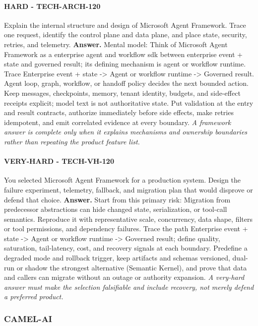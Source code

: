 \paragraph{HARD - TECH-ARCH-120} Explain the internal structure and design of Microsoft Agent Framework. Trace one request, identify the control plane and data plane, and place state, security, retries, and telemetry.
\textbf{Answer.} Mental model: Think of Microsoft Agent Framework as a enterprise agent and workflow sdk between enterprise event + state and governed result; its defining mechanism is agent or workflow runtime. Trace Enterprise event + state -> Agent or workflow runtime -> Governed result. Agent loop, graph, workflow, or handoff policy decides the next bounded action. Keep messages, checkpoints, memory, tenant identity, budgets, and side-effect receipts explicit; model text is not authoritative state. Put validation at the entry and result contracts, authorize immediately before side effects, make retries idempotent, and emit correlated evidence at every boundary.
\textit{A framework answer is complete only when it explains mechanisms and ownership boundaries rather than repeating the product feature list.}
\paragraph{VERY-HARD - TECH-VH-120} You selected Microsoft Agent Framework for a production system. Design the failure experiment, telemetry, fallback, and migration plan that would disprove or defend that choice.
\textbf{Answer.} Start from this primary risk: Migration from predecessor abstractions can hide changed state, serialization, or tool-call semantics. Reproduce it with representative scale, concurrency, data shape, filters or tool permissions, and dependency failures. Trace the path Enterprise event + state -> Agent or workflow runtime -> Governed result; define quality, saturation, tail-latency, cost, and recovery signals at each boundary. Predefine a degraded mode and rollback trigger, keep artifacts and schemas versioned, dual-run or shadow the strongest alternative (Semantic Kernel), and prove that data and callers can migrate without an outage or authority expansion.
\textit{A very-hard answer must make the selection falsifiable and include recovery, not merely defend a preferred product.}
\subsubsection*{CAMEL-AI}
